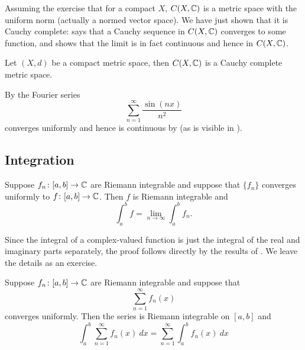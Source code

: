 Assuming the exercise that for a compact $X$, $C(X,{\mathbb{C}})$ is a metric space with
the uniform norm (actually a normed vector space).  We have just shown that
it is Cauchy complete:   says that a Cauchy
sequence in $C(X,{\mathbb{C}})$ converges to some function,
and  shows that the limit is in fact
continuous and hence in $C(X,{\mathbb{C}})$.

\begin{cor}
Let $(X,d)$ be a compact metric space, then $C(X,{\mathbb{C}})$ is a Cauchy
complete metric space.
\end{cor}

\begin{example}
By 
the Fourier series 
\begin{equation*}
\sum_{n=1}^\infty \frac{\sin(nx)}{n^2}
\end{equation*}
converges uniformly and hence is continuous by  (as is visible
in ).
\end{example}

\subsection{Integration}

\begin{prop} \label{prop:complexlimitswapintegral}
Suppose $f_n \colon [a,b] \to {\mathbb{C}}$
are Riemann integrable and suppose that $\{ f_n \}$ converges
uniformly to $f \colon [a,b] \to {\mathbb{C}}$.  Then $f$ is Riemann integrable
and
\begin{equation*}
\int_a^b f = \lim_{n\to \infty} \int_a^b f_n .
\end{equation*}
\end{prop}

Since the integral of a complex-valued function is just the integral of
the real and imaginary parts separately,
the proof follows directly by the results of
.
We leave the details as an exercise.

\begin{cor}
Suppose $f_n \colon [a,b] \to {\mathbb{C}}$
are Riemann integrable and suppose that
\begin{equation*}
\sum_{n=1}^\infty f_n(x)
\end{equation*}
converges uniformly.  Then the series is Riemann integrable on $[a,b]$
and
\begin{equation*}
\int_a^b \sum_{n=1}^\infty f_n(x) ~dx
=
\sum_{n=1}^\infty \int_a^b f_n(x) ~dx
\end{equation*}
\end{cor}

